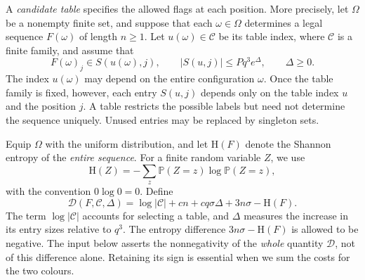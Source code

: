 \documentclass[11pt]{article}
\theoremstyle{definition}
\theoremstyle{remark}
\newcommand{\HH}{\mathrm H}
\newcommand{\PP}{\mathbb P}
\newcommand{\CC}{\mathcal C}
\newcommand{\DD}{\mathcal D}
\begin{document}
A \emph{candidate table} specifies the allowed flags at each position.
More precisely, let $\Omega$ be a nonempty finite set, and suppose that
each $\omega\in\Omega$ determines a legal sequence $F(\omega)$ of length
$n\ge1$. Let $u(\omega)\in\CC$ be its table index, where $\CC$ is a
finite family, and assume that
\[
 F(\omega)_j\in S(u(\omega),j),\qquad
 |S(u,j)|\le Pq^3e^\Delta,\qquad \Delta\ge0.
\]
The index $u(\omega)$ may depend on the entire configuration $\omega$.
Once the table family is fixed, however, each entry $S(u,j)$ depends
only on the table index $u$ and the position $j$. A table restricts the
possible labels but need not determine the sequence uniquely. Unused
entries may be replaced by singleton sets.

Equip $\Omega$ with the uniform distribution, and let $\HH(F)$ denote
the Shannon entropy of the \emph{entire sequence}. For a finite random
variable $Z$, we use
\[
 \HH(Z)=-\sum_z\PP(Z=z)\log\PP(Z=z),
\]
with the convention $0\log0=0$. Define
\begin{equation}\label{eq:defect}
 \DD(F,\CC,\Delta)
 =\log|\CC|+cn+cq\sigma\Delta+3n\sigma-\HH(F).
\end{equation}
The term $\log|\CC|$ accounts for selecting a table, and $\Delta$
measures the increase in its entry sizes relative to $q^3$. The entropy
difference $3n\sigma-\HH(F)$ is allowed to be negative. The input below
asserts the nonnegativity of the \emph{whole} quantity $\DD$, not of
this difference alone. Retaining its sign is essential when we sum the
costs for the two colours.
\end{document}

